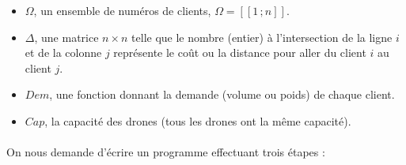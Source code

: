 \documentclass[a4paper,10pt]{report}
\newcommand{\segm}[1]{[\![1\,;#1]\!]}
\begin{document}
\begin{itemize}

\item $\Omega$, un ensemble de numéros de clients, $\Omega = \segm{n}$. 

\item $\Delta$, une matrice $n\times n$ telle que le nombre (entier) à l'intersection de la ligne $i$ et de la colonne $j$ représente le coût ou la distance pour aller du client $i$ au client $j$.

\item $Dem$, une fonction donnant la demande (volume ou poids) de chaque client.

\item $Cap$, la capacité des drones (tous les drones ont la même capacité).

\end{itemize}

\paragraph{}
On nous demande d'écrire un programme effectuant trois étapes :
\end{document}
